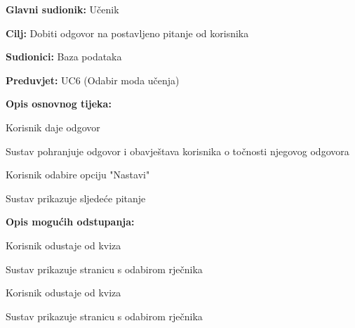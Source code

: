 					\noindent {}
					\begin{packed_item}
						
						\item \textbf{Glavni sudionik: } Učenik
						\item  \textbf{Cilj:} Dobiti odgovor na postavljeno pitanje od korisnika
						\item  \textbf{Sudionici:} Baza podataka
						\item  \textbf{Preduvjet:} UC6 (Odabir moda učenja)
						\item  \textbf{Opis osnovnog tijeka:}
						
						\item[] \begin{packed_enum}
							
							\item Korisnik daje odgovor
							\item Sustav pohranjuje odgovor i obavještava korisnika o točnosti njegovog odgovora
							\item Korisnik odabire opciju "Nastavi"
							\item Sustav prikazuje sljedeće pitanje
						\end{packed_enum}
						
						\item  \textbf{Opis mogućih odstupanja:}
						
						\item[] \begin{packed_item}
							
							\item[3.a] Korisnik odustaje od kviza
							\item[] \begin{packed_enum}
								
								\item Sustav prikazuje stranicu s odabirom rječnika
								
							\end{packed_enum}
							
							\item[4.a] Korisnik odustaje od kviza 
							\item[] \begin{packed_enum}
								
								\item Sustav prikazuje stranicu s odabirom rječnika
								
							\end{packed_enum}
							
						\end{packed_item}
					\end{packed_item}
					

